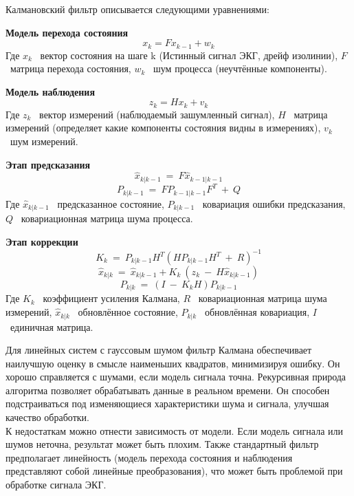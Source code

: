 \documentclass[10pt,a5paper]{article}
\numberwithin{figure}{section}
\numberwithin{table}{section}
\begin{document}
Калмановский фильтр описывается следующими уравнениями:

\textbf{Модель перехода состояния}
\begin{equation*}
  x_k=Fx_{k-1}+w_k
\end{equation*}
\noindent
Где 	$x_k$ \textendash\ вектор состояния на шаге k (Истинный сигнал ЭКГ, дрейф изолинии), $F$ \textendash\ матрица перехода состояния, 	$w_k$ \textendash\ шум процесса (неучтённые компоненты).

\textbf{Модель наблюдения}
\begin{equation*}
  z_k=Hx_k+v_k
\end{equation*}
\noindent
Где 	$z_k$ \textendash\ вектор измерений (наблюдаемый зашумленный сигнал), $H$ \textendash\ матрица измерений (определяет какие компоненты состояния видны в измерениях), $v_k$ \textendash\ шум измерений.

\textbf{Этап предсказания}
\begin{equation*}
  {\hat{x}}_{k|k-1}\ =\ F{\hat{x}}_{k-1|k-1}
\end{equation*}
\begin{equation*}
P_{k|k-1}\ =\ FP_{k-1|k-1}F^T\ +\ Q
\end{equation*}
\noindent
Где 	${\hat{x}}_{k|k-1}$ \textendash\ предсказанное состояние, $P_{k|k-1}$ \textendash\ ковариация ошибки предсказания, $Q$ \textendash\ ковариационная матрица шума процесса.

\textbf{Этап коррекции}
\begin{equation*}
  K_k\ =\ P_{k|k-1}H^T{(HP_{k|k-1}H^T\ +\ R)}^{-1}
\end{equation*}
\begin{equation*}
  {\hat{x}}_{k|k}\ =\ {\hat{x}}_{k|k-1}+K_k\ (z_k\ -\ H{\hat{x}}_{k|k-1})
\end{equation*}
\begin{equation*}
  P_{k|k}\ =\ (I\ -\ K_kH)P_{k|k-1}
\end{equation*}
\noindent
Где 	$K_k$ \textendash\ коэффициент усиления Калмана, $R$ \textendash\ ковариационная матрица шума измерений, ${\hat{x}}_{k|k}$ \textendash\ обновлённое состояние, $P_{k|k}$ \textendash\ обновлённая ковариация, $I$ \textendash\ единичная матрица.

Для линейных систем с гауссовым шумом фильтр Калмана обеспечивает наилучшую оценку в смысле наименьших квадратов, минимизируя ошибку. Он хорошо справляется с шумами, если модель сигнала точна. Рекурсивная природа алгоритма позволяет обрабатывать данные в реальном времени. Он способен подстраиваться под изменяющиеся характеристики шума и сигнала, улучшая качество обработки.\\
К недостаткам можно отнести зависимость от модели. Если модель сигнала или шумов неточна, результат может быть плохим. Также стандартный фильтр предполагает линейность (модель перехода состояния и наблюдения представляют собой линейные преобразования), что может быть проблемой при обработке сигнала ЭКГ.
\end{document}
